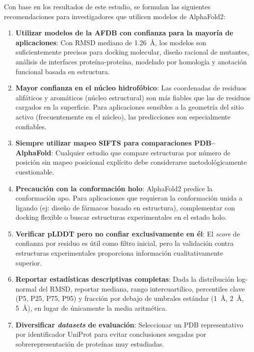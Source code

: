 Con base en los resultados de este estudio, se formulan las siguientes recomendaciones
para investigadores que utilicen modelos de AlphaFold2:

\begin{enumerate}
    \item \textbf{Utilizar modelos de la AFDB con confianza para la mayor\'ia de
    aplicaciones}: Con RMSD mediano de \SI{1,26}{\angstrom}, los modelos son
    suficientemente precisos para docking molecular, dise\~no racional de mutantes,
    an\'alisis de interfaces prote\'ina-prote\'ina, modelado por homolog\'ia y
    anotaci\'on funcional basada en estructura.

    \item \textbf{Mayor confianza en el n\'ucleo hidrofóbico}: Las coordenadas de
    residuos alif\'aticos y arom\'aticos (n\'ucleo estructural) son m\'as fiables que
    las de residuos cargados en la superficie. Para aplicaciones sensibles a la
    geometr\'ia del sitio activo (frecuentemente en el n\'ucleo), las predicciones
    son especialmente confiables.

    \item \textbf{Siempre utilizar mapeo SIFTS para comparaciones PDB--AlphaFold}:
    Cualquier estudio que compare estructuras por n\'umero de posici\'on sin mapeo
    posicional expl\'icito debe considerarse metodol\'ogicamente cuestionable.

    \item \textbf{Precauci\'on con la conformaci\'on holo}: AlphaFold2 predice la
    conformaci\'on apo. Para aplicaciones que requieran la conformaci\'on unida a
    ligando (ej: dise\~no de f\'armacos basado en estructura), complementar con
    docking flexible o buscar estructuras experimentales en el estado holo.

    \item \textbf{Verificar pLDDT pero no confiar exclusivamente en \'el}: El \textit{score} de
    confianza por residuo es \'util como filtro inicial, pero la validaci\'on contra
    estructuras experimentales proporciona informaci\'on cualitativamente superior.

    \item \textbf{Reportar estad\'isticas descriptivas completas}: Dada la distribuci\'on
    log-normal del RMSD, reportar mediana, rango intercuart\'ilico, percentiles clave
    (P5, P25, P75, P95) y fracci\'on por debajo de umbrales est\'andar
    (\SI{1}{\angstrom}, \SI{2}{\angstrom}, \SI{5}{\angstrom}), en lugar de \'unicamente
    la media aritm\'etica.

    \item \textbf{Diversificar \textit{datasets} de evaluaci\'on}: Seleccionar un PDB
    representativo por identificador UniProt para evitar conclusiones sesgadas por
    sobrerepresentaci\'on de prote\'inas muy estudiadas.
\end{enumerate}

